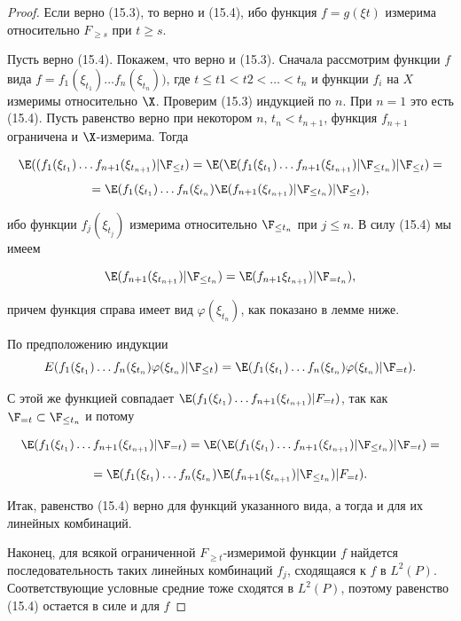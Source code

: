 \begin{proof}
    Если верно (15.3), то верно и (15.4), ибо функция $f = g(\xi t)$ измерима относительно $F_{\geq s}$ при $t \geq s$.

    Пусть верно (15.4). Покажем, что верно и (15.3). Сначала рассмотрим функции $f$ вида $f = f_1(\xi_{t_1})\ldots f_n(\xi_{t_n}))$, где $t \leq t1 < t2 < \ldots < t_n$ и функции $f_i$ на $X$ измеримы относительно $\X$. Проверим (15.3) индукцией по $n$. При $n = 1$ это есть (15.4). Пусть равенство верно при некотором $n$, $t_n < t_{n + 1}$, функция $f_{n+1}$ ограничена и $\X$-измерима. Тогда 
    
    \[ \E((f_1(\xi_{t_1}) \ldots f_{n+1}(\xi_{t_{n + 1}} )|\F_{\leq t}) = \E(\E(f_1(\xi_{t_1}) \ldots f_{n + 1}(\xi_{t_{n + 1}})|\F_{\leq t_n})|\F_{\leq t}) = \]
    \[ = \E(f_1(\xi_{t_1})\ldots  f_n (\xi_{t_n}) \E (f_{n + 1}(\xi_{t_{n + 1}} )|\F_{\leq t_n})|\F_{\leq t}), \]
    
    ибо функции $f_j(\xi_{t_j})$ измерима относительно $\F_{\leq t_n}$ при $j \leq n$. В силу (15.4) мы имеем 
    
    \[ \E(f_{n + 1}(\xi_{t_{n + 1}} )|\F_{\leq t_n}) = \E(f_{n + 1}\xi_{t_{n + 1}} )|\F_{=t_n}), \] 
    
    причем функция справа имеет вид $\varphi(\xi_{t_n})$, как показано в лемме ниже.
    
    По предположению индукции
    \[ E(f_1(\xi_{t_1})\ldots f_n(\xi_{t_n})\varphi(\xi_{t_n})|\F_{\leq t}) = \E(f_1(\xi_{t_1})\ldots f_n(\xi_{t_n})\varphi(\xi_{t_n})|\F_{=t}). \]
    
    С этой же функцией совпадает $\E(f_1(\xi_{t_1})\ldots f_{n + 1}(\xi_{t_{n + 1}} )|F_{=t})$, так как $\F_{=t} \subset \F_{\leq t_n}$ и потому
    
    \[ \E(f_1(\xi_{t_1})\ldots f_{n + 1}(\xi_{t_{n + 1}} )|\F_{=t})= \E(\E(f_1(\xi_{t_1})\ldots f_{n + 1}(\xi_{t_{n + 1}} )|\F_{\leq t_n})|\F_{=t}) = \]
    
    \[ = \E(f_1(\xi_{t_1})\ldots f_n(\xi_{t_n})\E(f_{n + 1}(\xi_{t_{n + 1}} )|\F_{\leq t_n})|F_{=t}). \]
    
    Итак, равенство (15.4) верно для функций указанного вида, а тогда и для их линейных комбинаций.

    Наконец, для всякой ограниченной $F_{\geq t}$-измеримой функции $f$ найдется последовательность таких линейных комбинаций $f_j$, сходящаяся к $f$ в $L^2(P)$. Соответствующие условные средние тоже сходятся в $L^2(P)$, поэтому равенство (15.4) остается в силе и для $f$
\end{proof}

